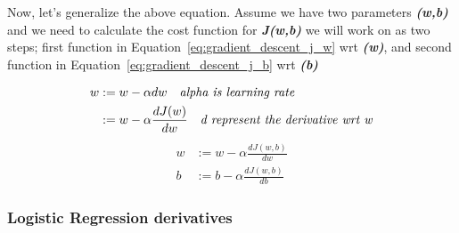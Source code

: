 Now, let's generalize the above equation. Assume we have two parameters \textbf{\textit{(w,b)}} and we need to calculate the cost function for \textbf{\textit{J(w,b)}} we will work on as two steps; first function in Equation~\eqref{eq:gradient_descent_j_w} wrt \textbf{\textit{(w)}}, and second function in Equation~\eqref{eq:gradient_descent_j_b} wrt \textbf{\textit{(b)}}%
%
\begin{figure}[!t]
\subfigure[Derivative Example of function $f(x) = x^2$]{~\label{Fig:Derivative_Example}
}
\subfigure[Derivative Example of function $f(x) = x^2$ where $\alpha_1$ > $\alpha_2$]{\label{Fig:Alpha_Change}
}
\end{figure}%
%
\begin{equation}\label{eq:gredient_descent_w}
 \begin{split}
  w & := w - \alpha dw \quad \text{\textit{alpha is learning rate}}\\
   & := w - \alpha \frac{dJ(w)}{dw} \quad \text{\textit{d represent the derivative wrt w}}
 \end{split}
\end{equation}
%
\begin{subequations}
   \begin{align}
w& := w - \alpha \frac{dJ(w,b)}{dw} \label{eq:gradient_descent_j_w}\\
b& := b - \alpha \frac{dJ(w,b)}{db} \label{eq:gradient_descent_j_b}
   \end{align}
 \end{subequations}
%
\subsubsection{Logistic Regression derivatives}\label{Sec:Logistic_Bp_Derivatives}

